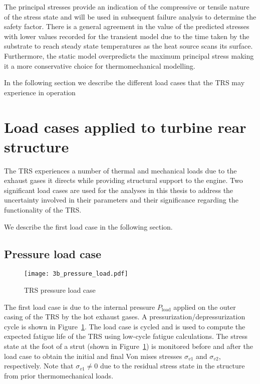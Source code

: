 The principal stresses provide an indication of the compressive or tensile nature of the stress state and will be used in subsequent failure analysis to determine the safety factor. There is a general agreement in the value of the predicted stresses with lower values recorded for the transient model due to the time taken by the substrate to reach steady state temperatures as the heat source scans its surface. Furthermore, the static model overpredicts the maximum principal stress making it a more conservative choice for thermomechanical modelling.

In the following section we describe the different load cases that the \ac{TRS} may experience in operation

\section{Load cases applied to turbine rear structure}
\label{sec:loadcases}

The \ac{TRS} experiences a number of thermal and mechanical loads due to the exhaust gases it directs while providing structural support to the engine. Two significant load cases are used for the analyses in this thesis to address the uncertainty involved in their parameters and their significance regarding the functionality of the \ac{TRS}.

We describe the first load case in the following section.

\subsection{Pressure load case} \label{subsec:iploadcase}

\begin{figure}[h!]
    \centering
    \texttt{[image: 3b\_pressure\_load.pdf]}
    \caption{ \label{fig:ipload} \ac{TRS} pressure load case }
\end{figure}

The first load case is due to the internal pressure $P_{\textrm{load}}$ applied on the outer casing of the \ac{TRS} by the hot exhaust gases. A pressurization/depressurization cycle is shown in Figure~\ref{fig:ipload}. The load case is cycled and is used to compute the expected fatigue life of the \ac{TRS} using low-cycle fatigue calculations. The stress state at the foot of a strut (shown in Figure~\ref{fig:ipload}) is monitored before and after the load case to obtain the initial and final Von mises stresses $\sigma_{v1}$ and $\sigma_{v2}$, respectively. Note that $\sigma_{v1} \neq 0$ due to the residual stress state in the structure from prior thermomechanical loads. 

